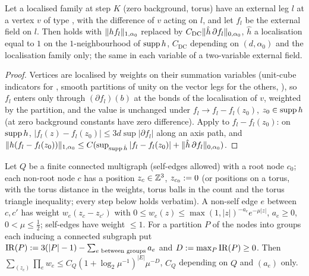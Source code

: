 \begin{lemma}\label{lem:a06e:DC}
Let a localised family at step $K$ (zero background, torus) have an external leg $l$ at a vertex $v$ of type \cite[(1.8)]{Ba3}, with the difference of $v$ acting on $l$, and let $f_l$ be the external field on $l$. Then \cite[(1.33)]{Ba3} holds with $\lVert hf_l\rVert_{1,\alpha_0}$ replaced by $C_{\mathrm{DC}}\lVert \hat h\,\partial f_l\rVert_{0,\alpha_0}$, $\hat h$ a localisation equal to $1$ on the $1$-neighbourhood of $\operatorname{supp} h$, $C_{\mathrm{DC}}$ depending on $(d,\alpha_0)$ and the localisation family only; the same in each variable of a two-variable external field.
\end{lemma}

\begin{proof}
Vertices are localised by weights on their summation variables (unit-cube indicators for \cite[(1.6)--(1.7)]{Ba3}, smooth partitions of unity on the vector legs for the others, \cite[p.~420]{Ba3}), so $f_l$ enters only through $(\partial f_l)(b)$ at the bonds of the localisation of $v$, weighted by the partition, and the value is unchanged under $f_l\to f_l-f_l(z_0)$, $z_0\in\operatorname{supp} h$ (at zero background constants have zero difference). Apply \cite[(1.33)]{Ba3} to $f_l-f_l(z_0)$: on $\operatorname{supp} h$, $|f_l(z)-f_l(z_0)|\le3d\sup|\partial f_l|$ along an axis path, and $\lVert h(f_l-f_l(z_0))\rVert_{1,\alpha_0}\le C(\sup_{\operatorname{supp}\hat h}|f_l-f_l(z_0)|+\lVert \hat h\,\partial f_l\rVert_{0,\alpha_0})$.
\end{proof}

\begin{lemma}\label{lem:a06e:IRC}
Let $Q$ be a finite connected multigraph (self-edges allowed) with a root node $c_0$; each non-root node $c$ has a position $z_c\in\mathbb Z^3$, $z_{c_0}:=0$ (or positions on a torus, with the torus distance in the weights, torus balls in the count and the torus triangle inequality; every step below holds verbatim). A non-self edge $e$ between $c,c'$ has weight $w_e(z_c-z_{c'})$ with $0\le w_e(z)\le\max(1,|z|)^{-a_e}e^{-\mu|z|}$, $a_e\ge0$, $0<\mu\le\frac12$; self-edges have weight $\le1$. For a partition $P$ of the nodes into groups each inducing a connected subgraph put $\mathrm{IR}(P):=3(|P|-1)-\sum_{e\text{ between groups}}a_e$ and $D:=\max_P\mathrm{IR}(P)\ge0$. Then $\sum_{(z_c)}\prod_ew_e\le C_Q(1+\log_2\mu^{-1})^{|E|}\mu^{-D}$, $C_Q$ depending on $Q$ and $(a_e)$ only.
\end{lemma}

